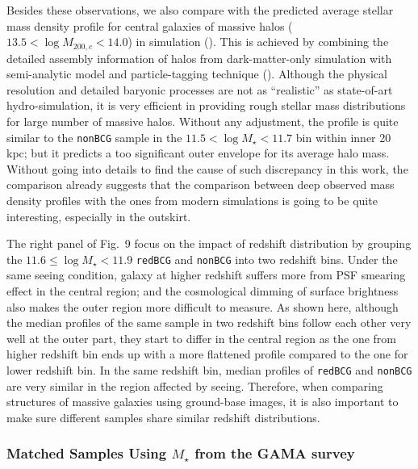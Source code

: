 \documentclass[preprint]{aastex}
\begin{document}
\begin{CJK*}{UTF8}{gbsn}
    Besides these observations, we also compare with the predicted average 
    stellar mass density profile for central galaxies of massive halos 
    ($13.5 < \log M_{200,c} < 14.0$) in simulation (\citealt{Cooper13}). 
    This is achieved by combining the detailed assembly information of halos 
    from dark-matter-only simulation with semi-analytic model and 
    particle-tagging technique (\citealt{Cooper10}).
    Although the physical resolution and detailed baryonic processes are 
    not as ``realistic'' as state-of-art hydro-simulation, it is very 
    efficient in providing rough stellar mass distributions for large number 
    of massive halos. 
    Without any adjustment, the profile is quite similar to the \texttt{nonBCG}
    sample in the $11.5 < \log M_{\star} < 11.7$ bin within inner 20 kpc; 
    but it predicts a too significant outer envelope for its average halo mass.
    Without going into details to find the cause of such discrepancy in this 
    work, the comparison already suggests that the comparison between deep 
    observed mass density profiles with the ones from modern simulations is 
    going to be quite interesting, especially in the outskirt. 
    
    The right panel of Fig.~9 focus on the impact of redshift distribution
    by grouping the $11.6 \le \log M_{\star} < 11.9$ \texttt{redBCG} and 
    \texttt{nonBCG} into two redshift bins.  
    Under the same seeing condition, galaxy at higher redshift suffers 
    more from PSF smearing effect in the central region; and the cosmological 
    dimming of surface brightness also makes the outer region more difficult 
    to measure.
    As shown here, although the median profiles of the same sample in two 
    redshift bins follow each other very well at the outer part, they 
    start to differ in the central region as the one from higher redshift bin
    ends up with a more flattened profile compared to the one for lower 
    redshift bin. 
    In the same redshift bin, median profiles of \texttt{redBCG} and 
    \texttt{nonBCG} are very similar in the region affected by seeing.   
    Therefore, when comparing structures of massive galaxies using 
    ground-base images, it is also important to make sure different samples 
    share similar redshift distributions. 

\subsubsection{Matched Samples Using $M_{\star}$ from the GAMA survey}


\end{CJK*}
\end{document}
